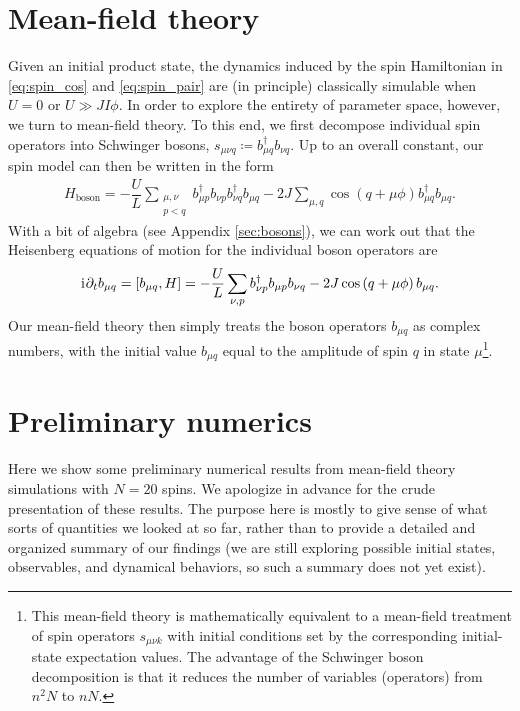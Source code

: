 \documentclass[nofootinbib,notitlepage,11pt]{revtex4-2}
\renewcommand{\t}{\text} %
\newcommand{\f}[2]{\dfrac{#1}{#2}} %
\newcommand{\p}[1]{\left(#1\right)} %
\renewcommand{\sp}[1]{\left[#1\right]} %
\renewcommand{\d}{\partial} %
\renewcommand{\i}{\mathrm{i}\mkern1mu} %
\newcommand{\1}{\mathds{1}}
\begin{document}
\section{Mean-field theory}

Given an initial product state, the dynamics induced by the spin Hamiltonian in \eqref{eq:spin_cos} and \eqref{eq:spin_pair} are (in principle) classically simulable when $U=0$ or $U\gg JI\phi$.
In order to explore the entirety of parameter space, however, we turn to mean-field theory.
To this end, we first decompose individual spin operators into Schwinger bosons, $s_{\mu\nu q}\coloneqq b_{\mu q}^\dag b_{\nu q}$.
Up to an overall constant, our spin model can then be written in the form
\begin{align}
  H_{\t{boson}} = - \f{U}{L} \sum_{\substack{\mu,\nu\\p<q}}
  b_{\mu p}^\dag b_{\nu p} b_{\nu q}^\dag b_{\mu q}
  - 2J \sum_{\mu,q} \cos\p{q+\mu\phi} b_{\mu q}^\dag b_{\mu q}.
\end{align}
With a bit of algebra (see Appendix \ref{sec:bosons}), we can work out that the Heisenberg equations of motion for the individual boson operators are
\begin{align}
  \i \d_t b_{\mu q} = \sp{b_{\mu q},H}
  = -\f{U}{L} \sum_{\nu,p} b_{\nu p}^\dag b_{\mu p} b_{\nu q}
  - 2J \cos\p{q+\mu\phi} b_{\mu q}.
\end{align}
Our mean-field theory then simply treats the boson operators $b_{\mu q}$ as complex numbers, with the initial value $b_{\mu q}$ equal to the amplitude of spin $q$ in state $\mu$\footnote{This mean-field theory is mathematically equivalent to a mean-field treatment of spin operators $s_{\mu\nu k}$ with initial conditions set by the corresponding initial-state expectation values.  The advantage of the Schwinger boson decomposition is that it reduces the number of variables (operators) from $n^2 N$ to $nN$.}.

\section{Preliminary numerics}
\label{sec:numerics}

Here we show some preliminary numerical results from mean-field theory simulations with $N=20$ spins.
We apologize in advance for the crude presentation of these results.
The purpose here is mostly to give sense of what sorts of quantities we looked at so far, rather than to provide a detailed and organized summary of our findings (we are still exploring possible initial states, observables, and dynamical behaviors, so such a summary does not yet exist).
\end{document}
